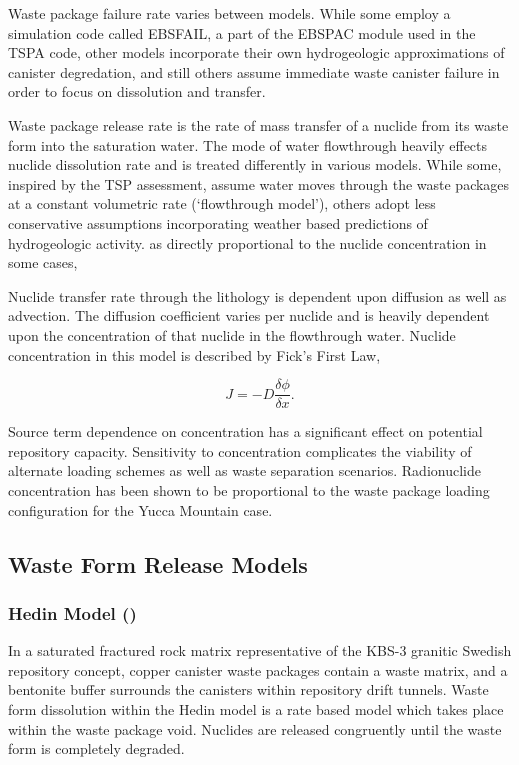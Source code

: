 Waste package failure rate varies between models. While some employ a 
simulation code called EBSFAIL, a part of the EBSPAC module used in 
the TSPA code, other models incorporate their own hydrogeologic 
approximations of canister degredation, and still others assume 
immediate waste canister failure in order to focus on dissolution and 
transfer. 

Waste package release rate is the rate of mass transfer of a nuclide 
from its waste form into the saturation water.
The mode of water flowthrough heavily effects nuclide dissolution rate 
and is treated differently in various models. While some, inspired by 
the TSP assessment, assume water moves through the waste packages at a 
constant volumetric rate (`flowthrough model'), others adopt less 
conservative assumptions incorporating weather based predictions of 
hydrogeologic activity. as directly proportional to the nuclide 
concentration in some cases,  

Nuclide transfer rate through the lithology is  dependent upon 
diffusion as well as advection.  The diffusion coefficient varies per 
nuclide and is heavily dependent upon the concentration of that 
nuclide in the flowthrough water. Nuclide concentration in this model 
is described by Fick's First Law, 

\begin{equation}
J = -D\frac{\delta\phi}{\delta x}.
\end{equation}

Source term dependence on concentration has a significant effect on 
potential repository capacity. Sensitivity to concentration 
complicates the viability of alternate loading schemes as well as 
waste separation scenarios. Radionuclide concentration has been shown 
to be proportional to the waste package loading configuration for the 
Yucca Mountain 
case.\cite{ahn_relationship_2002,kawasaki_congruent_2004}


\subsection{Waste Form Release Models}

\subsubsection{Hedin Model (\cite{hedin_integrated_2002})}

In a saturated fractured rock matrix representative of the KBS-3 
granitic Swedish repository concept, copper canister waste packages 
contain a waste matrix, and a bentonite buffer surrounds the canisters 
within repository drift tunnels. Waste form dissolution within the 
Hedin model is a rate based model which takes place within the waste 
package void. Nuclides are released congruently until the waste form 
is completely degraded. \cite{hedin_integrated_2002} 

